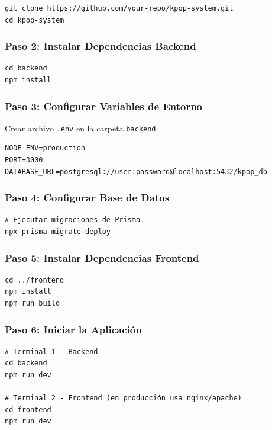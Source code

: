 \documentclass[12pt,a4paper,spanish,oneside]{report}
\begin{document}
\begin{verbatim}
git clone https://github.com/your-repo/kpop-system.git
cd kpop-system
\end{verbatim}

\subsubsection{Paso 2: Instalar Dependencias Backend}

\begin{verbatim}
cd backend
npm install
\end{verbatim}

\subsubsection{Paso 3: Configurar Variables de Entorno}

Crear archivo \texttt{.env} en la carpeta \texttt{backend}:

\begin{verbatim}
NODE_ENV=production
PORT=3000
DATABASE_URL=postgresql://user:password@localhost:5432/kpop_db
\end{verbatim}

\subsubsection{Paso 4: Configurar Base de Datos}

\begin{verbatim}
# Ejecutar migraciones de Prisma
npx prisma migrate deploy
\end{verbatim}

\subsubsection{Paso 5: Instalar Dependencias Frontend}

\begin{verbatim}
cd ../frontend
npm install
npm run build
\end{verbatim}

\subsubsection{Paso 6: Iniciar la Aplicación}

\begin{verbatim}
# Terminal 1 - Backend
cd backend
npm run dev

# Terminal 2 - Frontend (en producción usa nginx/apache)
cd frontend
npm run dev
\end{verbatim}
\end{document}

